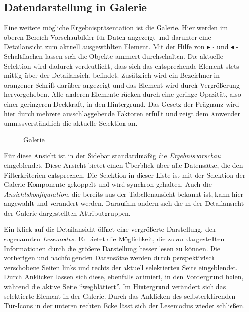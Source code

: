 \subsection{Datendarstellung in Galerie}
Eine weitere mögliche Ergebnispräsentation ist die Galerie. Hier werden im oberen Bereich Vorschaubilder für Daten angezeigt und darunter eine Detailansicht zum aktuell ausgewählten Element. Mit der Hilfe von $\blacktriangleright$ - und $\blacktriangleleft$ - Schaltflächen lassen sich die Objekte animiert durchschalten. Die aktuelle Selektion wird dadurch verdeutlicht, dass sich das entsprechende Element stets mittig über der Detailansicht befindet. Zusätzlich wird ein Bezeichner in orangener Schrift darüber angezeigt und das Element wird durch Vergrößerung hervorgehoben. Alle anderen Elemente rücken durch eine geringe Opazität, also einer geringeren Deckkraft, in den Hintergrund. Das Gesetz der Prägnanz wird hier durch mehrere ausschlaggebende Faktoren erfüllt und zeigt dem Anwender unmissverständlich die aktuelle Selektion an.\par
\begin{figure}[H]
 \centering
 \setlength{\fboxsep}{0pt}
 \setlength{\fboxrule}{0.5pt}
 \caption{Galerie}
 \label{fig:gallery}
\end{figure}
Für diese Ansicht ist in der Sidebar standardmäßig die \textit{Ergebnisvorschau} eingeblendet. Diese Ansicht bietet einen Überblick über alle Datensätze, die den Filterkriterien entsprechen. Die Selektion in dieser Liste ist mit der Selektion der Galerie-Komponente gekoppelt und wird synchron gehalten. Auch die \textit{Ansichtskonfiguration}, die bereits aus der Tabellenansicht bekannt ist, kann hier angewählt und verändert werden. Daraufhin ändern sich die in der Detailansicht der Galerie dargestellten Attributgruppen.\par
Ein Klick auf die Detailansicht öffnet eine vergrößerte Darstellung, den sogenannten \textit{Lesemodus}. Er bietet die Möglichkeit, die zuvor dargestellten Informationen durch die größere Darstellung besser lesen zu können. Die vorherigen und nachfolgenden Datensätze werden durch perspektivisch verschobene Seiten links und rechts der aktuell selektierten Seite eingeblendet. Durch Anklicken lassen sich diese, ebenfalls animiert, in den Vordergrund holen, während die aktive Seite \enquote{wegblättert}. Im Hintergrund verändert sich das selektierte Element in der Galerie. Durch das Anklicken des selbsterklärenden Tür-Icons in der unteren rechten Ecke lässt sich der Lesemodus wieder schließen.\par
